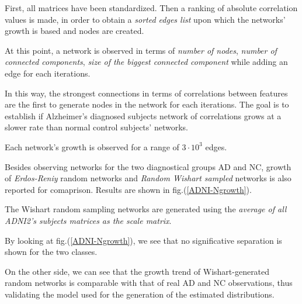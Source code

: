 \documentclass[12pt,openright,twoside,a4paper]{book}
\begin{document}
First, all matrices have been standardized. Then a ranking of absolute correlation values is made, in order to obtain a \textit{sorted edges list} upon which the networks' growth is based and nodes are created.

At this point, a network is observed in terms of \textit{number of nodes}, \textit{number of connected components}, \textit{size of the biggest connected component} while adding an edge for each iterations. 

In this way, the strongest connections in terms of correlations between features are the first to generate nodes in the network for each iterations. The goal is to establish if Alzheimer's diagnosed subjects network of correlations grows at a slower rate than normal control subjects' networks.

Each network's growth is observed for a range of $3\cdot 10^3$ edges.

Besides observing networks for the two diagnostical groups AD and NC,  growth of \textit{Erdos-Reniy} random networks and \textit{Random Wishart sampled} networks is also reported for comaprison. Results are shown in fig.(\ref{ADNI-Ngrowth}).

The Wishart random sampling networks are generated using the \textit{average of all ADNI2's subjects matrices as the scale matrix}.
\vspace{5mm}

By looking at fig.(\ref{ADNI-Ngrowth}), we see that no significative separation is shown for the two classes.

On the other side, we can see that the growth trend of Wishart-generated random networks is comparable with that of real AD and NC observations, thus validating the model used for the generation of the estimated distributions.
\end{document}
